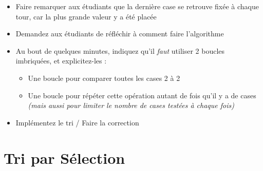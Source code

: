 \documentclass[11pt,a4paper]{article}
\begin{document}
\begin{itemize}
\item Faire remarquer aux étudiants que la dernière case se retrouve fixée à chaque tour, car la plus grande valeur y a été placée \\
\item Demandez aux étudiants de réfléchir à comment faire l'algorithme \\
\item Au bout de quelques minutes, indiquez qu'il \textit{faut} utiliser 2 boucles imbriquées, et explicitez-les :
  \begin{itemize}
  \item Une boucle pour comparer toutes les cases 2 à 2
  \item Une boucle pour répéter cette opération autant de fois qu'il y a de cases
    \textit{(mais aussi pour limiter le nombre de cases testées à chaque fois)}
  \end{itemize}
\item Implémentez le tri / Faire la correction
\end{itemize}




\section{Tri par Sélection}
\end{document}
